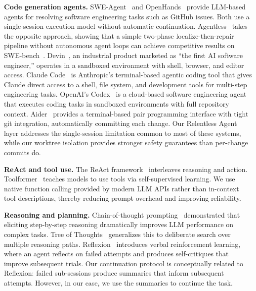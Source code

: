 \documentclass{article}
\begin{document}
\textbf{Code generation agents.} SWE-Agent~\citep{yang2024sweagent} and OpenHands~\citep{wang2024openhands} provide LLM-based agents for resolving software engineering tasks such as GitHub issues.  Both use a single-session execution model without automatic continuation. Agentless~\citep{xia2024agentless} takes the opposite approach, showing that a simple two-phase localize-then-repair pipeline without autonomous agent loops can achieve competitive results on SWE-bench~\citep{jimenez2024swebench}.  Devin~\citep{devin2024}, an industrial product marketed as ``the first AI software engineer,'' operates in a sandboxed environment with shell, browser, and editor access.  Claude Code~\citep{claudecode2025} is Anthropic's terminal-based agentic coding tool that gives Claude direct access to a shell, file system, and development tools for multi-step engineering tasks.  OpenAI's Codex~\citep{codex2025} is a cloud-based software engineering agent that executes coding tasks in sandboxed environments with full repository context.  Aider~\citep{aider2023} provides a terminal-based pair programming interface with tight git integration, automatically committing each change.  Our Relentless Agent layer addresses the single-session limitation common to most of these systems, while our worktree isolation provides stronger safety guarantees than per-change commits do.

\textbf{ReAct and tool use.} The ReAct framework~\citep{yao2023react} interleaves reasoning and action. Toolformer~\citep{schick2023toolformer} teaches models to use tools via self-supervised learning.  We use native function calling provided by modern LLM APIs rather than in-context tool descriptions, thereby reducing prompt overhead and improving reliability.

\textbf{Reasoning and planning.} Chain-of-thought prompting~\citep{wei2022chain} demonstrated that eliciting step-by-step reasoning dramatically improves LLM performance on complex tasks.  Tree of Thoughts~\citep{yao2023tree} generalizes this to deliberate search over multiple reasoning paths. Reflexion~\citep{shinn2023reflexion} introduces verbal reinforcement learning, where an agent reflects on failed attempts and produces self-critiques that improve subsequent trials.  Our continuation protocol is conceptually related to Reflexion: failed sub-sessions produce summaries that inform subsequent attempts. However, in our case, we use the summaries to continue the task.
\end{document}
